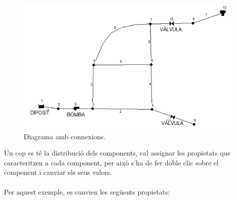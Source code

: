 \documentclass[12pt]{article}
\begin{document}
\begin{figure}[h!]
	\centering
	\includegraphics[scale=.6]{imatges/epanet/6.png}
	\caption{Diagrama amb connexions.}
\end{figure}
Un cop es té la distribució dels components, cal assignar les propietats que caracteritzen a cada component, per això s'ha de fer doble clic sobre el component i canviar els seus valors.
\\\\Per aquest exemple, es canvien les següents propietats: 
\end{document}
